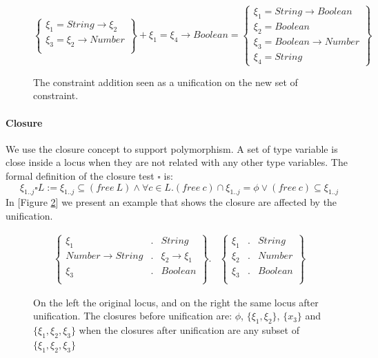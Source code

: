 \documentclass[a4paper]{report}
\newcommand{\reffig}[1]{[Figure \ref{#1}]}
\begin{document}
\begin{figure}
\centering
$$\left\{\begin{array}{c}
\xi_1 = String \to \xi_2\\
\xi_3 = \xi_2 \to Number\\
\end{array}\right\}+\xi_1 = \xi_4\to Boolean = \left\{\begin{array}{c}
\xi_1 = String \to Boolean\\
\xi_2 = Boolean\\
\xi_3 = Boolean \to Number\\
\xi_4 = String
\end{array}\right\}$$
\caption{The constraint addition seen as a unification on the new set of constraint.}
\label{constr_add}
\end{figure}

\paragraph{Closure} We use the closure concept to support polymorphism. A set of type variable is close inside a locus when they are not related with any other type variables. The formal definition of the closure test $\square$ is:
$$\xi_{1..j} \square L := \xi_{1..j}\subseteq (free\ L)\wedge\forall c\in L. (free\ c)\cap\xi_{1..j}=\phi \vee (free\ c)\subseteq \xi_{1..j}$$
In \reffig{closure_example} we present an example that shows the closure are affected by the unification.

\begin{figure}
\centering
$$\begin{array}{c||c}
\left\{\begin{array}{rcl}
\xi_1 &.& String\\
Number\to String &.& \xi_2\to\xi_1\\
\xi_3 &.& Boolean\\
\end{array}\right\}.
&
\left\{\begin{array}{rlc}
\xi_1 &.& String\\
\xi_2 &.& Number\\
\xi_3 &.& Boolean\\
\end{array}\right\}
\end{array}$$
\caption{On the left the original locus, and on the right the same locus after unification. The closures before unification are: $\phi$, $\{\xi_1,\xi_2\}$, $\{x_3\}$ and $\{\xi_1,\xi_2,\xi_3\}$ when the closures after unification are any subset of $\{\xi_1,\xi_2,\xi_3\}$}
\label{closure_example}
\end{figure}
\end{document}
